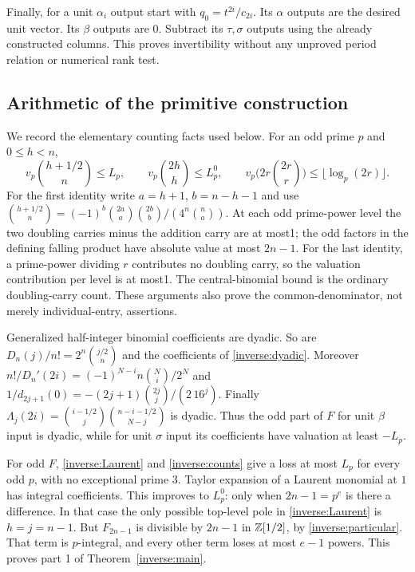 \documentclass[11pt,a4paper]{article}
\numberwithin{equation}{section}
\theoremstyle{definition}\newtheorem{definition}[theorem]{Definition}
\theoremstyle{remark}\newtheorem{remark}[theorem]{Remark}
\begin{document}
Finally, for a unit $\alpha_i$ output start with $q_0=t^{2i}/c_{2i}$. Its $\alpha$ outputs are the desired unit vector. Its $\beta$ outputs are $0$. Subtract its $\tau,\sigma$ outputs using the already constructed columns. This proves invertibility without any unproved period relation or numerical rank test.

\subsection{Arithmetic of the primitive construction}
We record the elementary counting facts used below. For an odd prime $p$ and $0\le h<n$,
\begin{equation}\label{inverse:counts}
 v_p\binom{h+1/2}{n}\le L_p,\qquad
 v_p\binom{2h}h\le L_p^0,\qquad
 v_p\big(2r\binom{2r}r\big)\le\lfloor\log_p(2r)\rfloor.
\end{equation}
For the first identity write $a=h+1$, $b=n-h-1$ and use
$\binom{h+1/2}{n}=(-1)^b\binom{2a}a\binom{2b}b/(4^n\binom na)$.
At each odd prime-power level the two doubling carries minus the addition carry are at most1; the odd factors in the defining falling product have absolute value at most $2n-1$. For the last identity, a prime-power dividing $r$ contributes no doubling carry, so the valuation contribution per level is at most1. The central-binomial bound is the ordinary doubling-carry count. These arguments also prove the common-denominator, not merely individual-entry, assertions.

Generalized half-integer binomial coefficients are dyadic. So are $D_n(j)/n!=2^n\binom{j/2}{n}$ and the coefficients of \eqref{inverse:dyadic}. Moreover
$n!/D_n'(2i)=(-1)^{N-i}n\binom Ni/2^N$ and
$1/d_{2j+1}(0)=-(2j+1)\binom{2j}j/(2\,16^j)$.
Finally $\Lambda_j(2i)=\binom{i-1/2}{j}\binom{n-i-1/2}{N-j}$ is dyadic. Thus the odd part of $F$ for unit $\beta$ input is dyadic, while for unit $\sigma$ input its coefficients have valuation at least $-L_p$.

For odd $F$, \eqref{inverse:Laurent} and \eqref{inverse:counts} give a loss at most $L_p$ for every odd $p$, with no exceptional prime $3$. Taylor expansion of a Laurent monomial at $1$ has integral coefficients. This improves to $L_p^0$: only when $2n-1=p^e$ is there a difference. In that case the only possible top-level pole in \eqref{inverse:Laurent} is $h=j=n-1$. But $F_{2n-1}$ is divisible by $2n-1$ in $\mathbb Z[1/2]$, by \eqref{inverse:particular}. That term is $p$-integral, and every other term loses at most $e-1$ powers. This proves part 1 of Theorem~\ref{inverse:main}.
\end{document}
